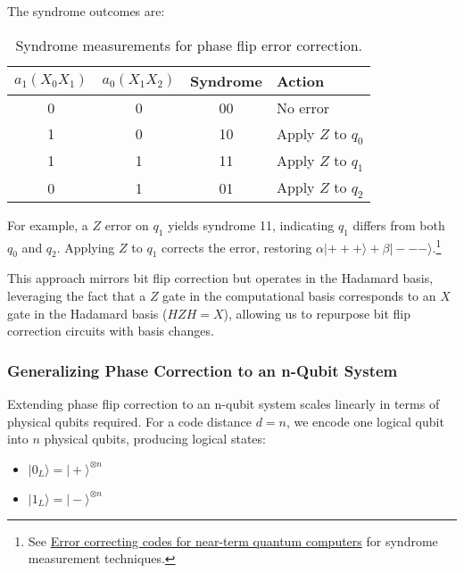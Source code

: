 The syndrome outcomes are:

\begin{table}[H]
  \centering
  \begin{tabular}{cccl}
    \toprule
    \( a_1  (X_0 X_1) \) & \( a_0  (X_1 X_2) \) & Syndrome & Action \\
    \midrule
    0 & 0 & 00 & No error \\
    1 & 0 & 10 & Apply \( Z \) to \( q_0 \) \\
    1 & 1 & 11 & Apply \( Z \) to \( q_1 \) \\
    0 & 1 & 01 & Apply \( Z \) to \( q_2 \) \\
    \bottomrule
  \end{tabular}
  \caption{Syndrome measurements for phase flip error correction.}
\end{table}

For example, a \( Z \) error on \( q_1 \) yields syndrome 11, indicating \(
q_1 \) differs from both \( q_0 \) and \( q_2 \). Applying \( Z \) to \( q_1
\) corrects the error, restoring \( \alpha |+++\rangle + \beta |---\rangle
\).\footnote{See \href{https://www.ibm.com/quantum/blog/error-correction-codes}
{Error correcting codes for near-term quantum computers} for syndrome
measurement techniques.}

This approach mirrors bit flip correction but operates in the Hadamard basis,
leveraging the fact that a \( Z \) gate in the computational basis
corresponds to an \( X \) gate in the Hadamard basis (\( H Z H = X \)),
allowing us to repurpose bit flip correction circuits with basis changes.

\subsubsection*{Generalizing Phase Correction to an n-Qubit System}

Extending phase flip correction to an n-qubit system scales linearly in terms
of physical qubits required. For a code distance \( d = n \), we encode one
logical qubit into \( n \) physical qubits, producing logical states:

\begin{itemize}
  \item \( |0_L\rangle = |+\rangle^{\otimes n} \)
  \item \( |1_L\rangle = |-\rangle^{\otimes n} \)
\end{itemize}

\vspace{0.3cm}

